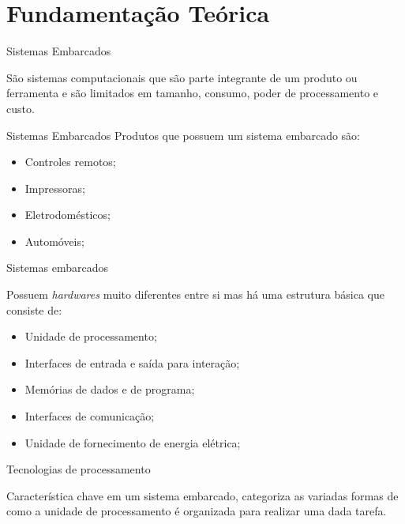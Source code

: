 \section{Fundamentação Teórica}
\begin{frame}{Sistemas Embarcados}

São sistemas computacionais que são parte integrante de um produto ou ferramenta e são limitados em tamanho, consumo, poder de processamento e custo. 

\end{frame}


\begin{frame}{Sistemas Embarcados}
    Produtos que possuem um sistema embarcado são:

    \begin{itemize}
        \item Controles remotos;
        \item Impressoras;
        \item Eletrodomésticos;
        \item Automóveis;
    \end{itemize}
\end{frame}

\begin{frame}{Sistemas embarcados}

    Possuem \textit{hardwares} muito diferentes entre si mas há uma estrutura básica que consiste de:
    \begin{itemize}
        \item Unidade de processamento;
        \item Interfaces de entrada e saída para interação;
        \item Memórias de dados e de programa;
        \item Interfaces de comunicação;
        \item Unidade de fornecimento de energia elétrica;
        
    \end{itemize}
\end{frame}



\begin{frame}{Tecnologias de processamento}

Característica chave em um sistema embarcado, categoriza as variadas formas de como a unidade de processamento é organizada para realizar uma dada tarefa. 

\end{frame}

